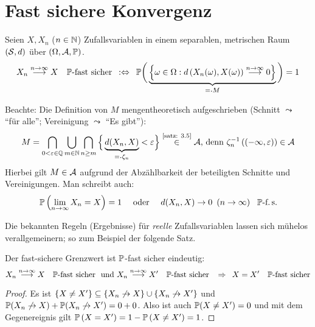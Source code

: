 
\section{Fast sichere Konvergenz}
\begin{definition} \label{definition: 3.6}
	Seien $X, X_n$ ($n \in \N$) Zufallsvariablen in einem separablen, metrischen Raum $(\S,d)$ über $(\Omega,\A,\P)$.
	\begin{equation*}
		X_n \ntoinf X \quad \P\text{-fast sicher}
		\defequiv
		\P\bigg( \underbrace{\menge{\omega \in \Omega : d\brackets{X_n(\omega),X(\omega)} \ntoinf 0}}_{\defqe M} \bigg) = 1
	\end{equation*}
\end{definition}

Beachte: Die Definition von $M$ mengentheoretisch aufgeschrieben (Schnitt $\leadsto$ \enquote{für alle}; Vereinigung $\leadsto$ \enquote{Es gibt}):
\begin{equation*}
	M =
	\bigcap_{0 < \epsilon \in \Q}
	\bigcup_{m \in \N}
	\bigcap_{n \ge m}
	\Big\{ \underbrace{d(X_n,X)}_{\defqe \zeta_n} < \epsilon \Big\} \overset{\text{\cref{satz: 3.5}}}{\in} \A
	\text{, denn }\zeta_n^{-1} \brackets{(-\infty,\epsilon)} \in  \A
\end{equation*}
Hierbei gilt $M \in \A$ aufgrund der Abzählbarkeit der beteiligten Schnitte und Vereinigungen. 
Man schreibt auch:
\begin{align*}
	\P\brackets{ \lim_{n \to \infty} X_n = X} = 1 \quad \text{ oder } \quad d(X_n, X) \to  0 \enskip (n \to \infty) \enskip \text{ $\P$-f.\,s.}
\end{align*}

Die bekannten Regeln (Ergebnisse) für \textit{reelle} Zufallsvariablen lassen sich mühelos verallgemeinern; so zum Beispiel der folgende Satz.
\begin{satz} \label{satz: 3.7}
	Der fast-sichere Grenzwert ist $\P$-fast sicher eindeutig:
	\begin{equation*}
		X_n \ntoinf X \quad \P\text{-fast sicher } \und 
		X_n \ntoinf X' \quad\P\text{-fast sicher }
		\follows 
		X = X' \quad \P\text{-fast sicher}
	\end{equation*}
\end{satz}
\begin{proof} 
	Es ist $\menge{ X\neq X'} \subseteq \menge{X_n \not\to  X} \cup \menge{X_n \not\to  X'}$ und $\P(X_n \not\to X) + \P(X_n \not\to X') = 0+0$. Also ist auch $\P(X \neq X') = 0$ und mit dem Gegenereignis gilt $\P\brackets{X = X'} = 1-\P\brackets{X\neq X'} = 1$.
\end{proof}

